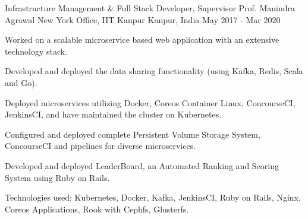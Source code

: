 \begin{cventries}
  \cventry
    {Infrastructure Management \& Full Stack Developer, Supervisor Prof. Manindra Agrawal} %
    {New York Office, IIT Kanpur} %
    {Kanpur, India} %
    {May 2017 - Mar 2020} %
    {
      \begin{cvitems} %
        \item {Worked on a scalable microservice based web application with an extensive technology stack.}
        \item {Developed and deployed the data sharing functionality (using Kafka, Redis, Scala and Go).}
        \item {Deployed microservices utilizing Docker, Coreos Container Linux, ConcourseCI, JenkinsCI, and have maintained the cluster on Kubernetes.}
        \item {Configured and deployed complete Persistent Volume Storage System, ConcourseCI and pipelines for diverse microservices.}
        \item {Developed and deployed LeaderBoard, an Automated Ranking and Scoring System using Ruby on Rails.}
        \item {Technologies used: Kubernetes, Docker, Kafka, JenkinsCI, Ruby on Rails, Nginx, Coreos Applications, Rook with Cephfs, Glusterfs.}
      \end{cvitems}
    }

\end{cventries}
